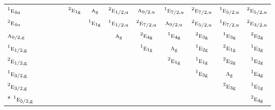 \documentclass[10pt,a4paper]{article}
\numberwithin{equation}{section}
\newcommand{\irr}[1]{\text{\normalfont\scshape #1}}
\newcommand{\conjpair}[1]{{}^{#1}}
\newcommand{\ptag}[1]{\mathrm{#1}}
\begin{document}
{\begin{longtable}{@{}lcccccccccccc@{}}
$\conjpair{1}\irr{e}_{4\ptag{u}}$ &  &  &  &  & $\conjpair{2}\irr{e}_{1\ptag{g}}$ & $\irr{a}_{\ptag{g}}$ & $\conjpair{2}\irr{e}_{1/2,\ptag{u}}$ & $\irr{a}_{9/2,\ptag{u}}$ & $\conjpair{1}\irr{e}_{7/2,\ptag{u}}$ & $\conjpair{2}\irr{e}_{7/2,\ptag{u}}$ & $\conjpair{1}\irr{e}_{5/2,\ptag{u}}$ & $\conjpair{2}\irr{e}_{5/2,\ptag{u}}$\\
$\conjpair{2}\irr{e}_{4\ptag{u}}$ &  &  &  &  &  & $\conjpair{1}\irr{e}_{1\ptag{g}}$ & $\conjpair{1}\irr{e}_{1/2,\ptag{u}}$ & $\conjpair{2}\irr{e}_{7/2,\ptag{u}}$ & $\irr{a}_{9/2,\ptag{u}}$ & $\conjpair{2}\irr{e}_{5/2,\ptag{u}}$ & $\conjpair{1}\irr{e}_{7/2,\ptag{u}}$ & $\conjpair{2}\irr{e}_{3/2,\ptag{u}}$\\
$\irr{a}_{9/2,\ptag{g}}$ &  &  &  &  &  &  & $\irr{a}_{\ptag{g}}$ & $\conjpair{2}\irr{e}_{4\ptag{g}}$ & $\conjpair{1}\irr{e}_{4\ptag{g}}$ & $\conjpair{2}\irr{e}_{3\ptag{g}}$ & $\conjpair{1}\irr{e}_{3\ptag{g}}$ & $\conjpair{2}\irr{e}_{2\ptag{g}}$\\
$\conjpair{1}\irr{e}_{1/2,\ptag{g}}$ &  &  &  &  &  &  &  & $\conjpair{1}\irr{e}_{1\ptag{g}}$ & $\irr{a}_{\ptag{g}}$ & $\conjpair{1}\irr{e}_{2\ptag{g}}$ & $\conjpair{2}\irr{e}_{1\ptag{g}}$ & $\conjpair{1}\irr{e}_{3\ptag{g}}$\\
$\conjpair{2}\irr{e}_{1/2,\ptag{g}}$ &  &  &  &  &  &  &  &  & $\conjpair{2}\irr{e}_{1\ptag{g}}$ & $\conjpair{1}\irr{e}_{1\ptag{g}}$ & $\conjpair{2}\irr{e}_{2\ptag{g}}$ & $\conjpair{1}\irr{e}_{2\ptag{g}}$\\
$\conjpair{1}\irr{e}_{3/2,\ptag{g}}$ &  &  &  &  &  &  &  &  &  & $\conjpair{1}\irr{e}_{3\ptag{g}}$ & $\irr{a}_{\ptag{g}}$ & $\conjpair{1}\irr{e}_{4\ptag{g}}$\\
$\conjpair{2}\irr{e}_{3/2,\ptag{g}}$ &  &  &  &  &  &  &  &  &  &  & $\conjpair{2}\irr{e}_{3\ptag{g}}$ & $\conjpair{1}\irr{e}_{1\ptag{g}}$\\*
$\conjpair{1}\irr{e}_{5/2,\ptag{g}}$ &  &  &  &  &  &  &  &  &  &  &  & $\conjpair{2}\irr{e}_{4\ptag{g}}$\\
\bottomrule\end{longtable}}
\end{document}
